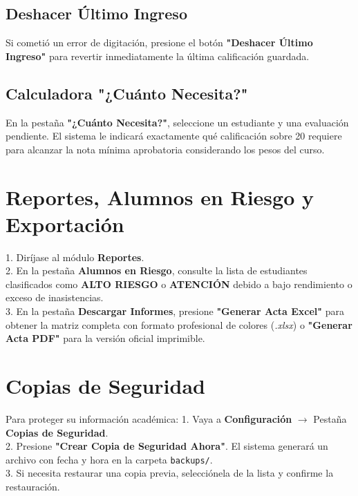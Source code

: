 \documentclass[12pt,a4paper]{article}
\begin{document}
\subsection{Deshacer Último Ingreso}
Si cometió un error de digitación, presione el botón \textbf{"Deshacer Último Ingreso"} para revertir inmediatamente la última calificación guardada.

\subsection{Calculadora "¿Cuánto Necesita?"}
En la pestaña \textbf{"¿Cuánto Necesita?"}, seleccione un estudiante y una evaluación pendiente. El sistema le indicará exactamente qué calificación sobre 20 requiere para alcanzar la nota mínima aprobatoria considerando los pesos del curso.

\section{Reportes, Alumnos en Riesgo y Exportación}
1. Diríjase al módulo \textbf{Reportes}.\\
2. En la pestaña \textbf{Alumnos en Riesgo}, consulte la lista de estudiantes clasificados como \textbf{ALTO RIESGO} o \textbf{ATENCIÓN} debido a bajo rendimiento o exceso de inasistencias.\\
3. En la pestaña \textbf{Descargar Informes}, presione \textbf{"Generar Acta Excel"} para obtener la matriz completa con formato profesional de colores (\textit{.xlsx}) o \textbf{"Generar Acta PDF"} para la versión oficial imprimible.

\section{Copias de Seguridad}
Para proteger su información académica:
1. Vaya a \textbf{Configuración} $\rightarrow$ Pestaña \textbf{Copias de Seguridad}.\\
2. Presione \textbf{"Crear Copia de Seguridad Ahora"}. El sistema generará un archivo con fecha y hora en la carpeta \texttt{backups/}.\\
3. Si necesita restaurar una copia previa, selecciónela de la lista y confirme la restauración.
\end{document}
